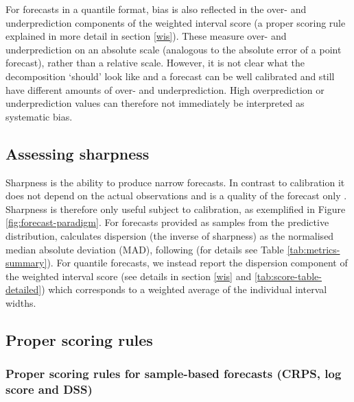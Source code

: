 \documentclass[
]{jss}
\begin{document}
For forecasts in a quantile format, bias is also reflected in the over-
and underprediction components of the weighted interval score (a proper
scoring rule explained in more detail in section \ref{wis}). These
measure over- and underprediction on an absolute scale (analogous to the
absolute error of a point forecast), rather than a relative scale.
However, it is not clear what the decomposition `should' look like and a
forecast can be well calibrated and still have different amounts of
over- and underprediction. High overprediction or underprediction values
can therefore not immediately be interpreted as systematic bias.

\hypertarget{assessing-sharpness}{%
\subsection{Assessing sharpness}\label{assessing-sharpness}}

Sharpness is the ability to produce narrow forecasts. In contrast to
calibration it does not depend on the actual observations and is a
quality of the forecast only
\citep{gneitingProbabilisticForecastsCalibration2007}. Sharpness is
therefore only useful subject to calibration, as exemplified in Figure
\ref{fig:forecast-paradigm}. For forecasts provided as samples from the
predictive distribution,  calculates dispersion (the
inverse of sharpness) as the normalised median absolute deviation (MAD),
following \cite{funkAssessingPerformanceRealtime2019} (for details see
Table \ref{tab:metrics-summary}). For quantile forecasts, we instead
report the dispersion component of the weighted interval score (see
details in section \ref{wis} and \ref{tab:score-table-detailed}) which
corresponds to a weighted average of the individual interval widths.

\hypertarget{proper-scoring-rules}{%
\subsection{Proper scoring rules}\label{proper-scoring-rules}}

\hypertarget{proper-scoring-rules-for-sample-based-forecasts-crps-log-score-and-dss}{%
\subsubsection{Proper scoring rules for sample-based forecasts (CRPS,
log score and
DSS)}\label{proper-scoring-rules-for-sample-based-forecasts-crps-log-score-and-dss}}
\end{document}
